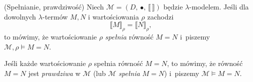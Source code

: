   \begin{definicja}(Spełnianie, prawdziwość)
    Niech \(\mathcal{M}=(D,\,\bullet,\,\llbracket\,\rrbracket)\) będzie \(\lambda\)-modelem.
    Jeśli dla dowolnych \(\lambda\)-termów \(M, N\) i wartościowania \(\rho\) zachodzi
    \[
      \llbracket M \rrbracket_\rho = \llbracket N \rrbracket_\rho,
    \]
    to mówimy, że wartościowanie \(\rho\) \emph{spełnia} równość \(M=N\) i~piszemy \(\mathcal{M},\rho\models M=N.\)

    Jeśli każde wartościowanie \(\rho\) spełnia równość \(M=N\), to mówimy, że równość \(M=N\) jest \emph{prawdziwa} w \(\mathcal{M}\) (lub \(\mathcal{M}\) \emph{spełnia} \(M=N\)) i~piszemy \(\mathcal{M}\models M=N\).
  \end{definicja}



